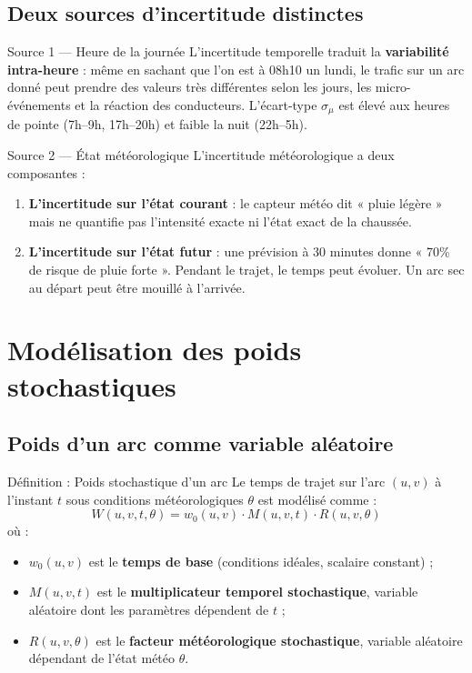 \documentclass[12pt,a4paper]{article}
\theoremstyle{definition}
\theoremstyle{remark}
\begin{document}
\subsection{Deux sources d'incertitude distinctes}

\begin{defbox}{Source 1 — Heure de la journée}
L'incertitude temporelle traduit la \textbf{variabilité intra-heure} :
même en sachant que l'on est à 08h10 un lundi, le trafic sur un arc
donné peut prendre des valeurs très différentes selon les jours,
les micro-événements et la réaction des conducteurs. L'écart-type
$\sigma_\mu$ est élevé aux heures de pointe (7h–9h, 17h–20h) et
faible la nuit (22h–5h).
\end{defbox}

\begin{defbox}{Source 2 — État météorologique}
L'incertitude météorologique a deux composantes :
\begin{enumerate}[leftmargin=1.5em]
  \item \textbf{L'incertitude sur l'état courant} : le capteur météo
    dit « pluie légère » mais ne quantifie pas l'intensité exacte ni
    l'état exact de la chaussée.
  \item \textbf{L'incertitude sur l'état futur} : une prévision à
    30 minutes donne « 70\% de risque de pluie forte ». Pendant le
    trajet, le temps peut évoluer. Un arc sec au départ peut être
    mouillé à l'arrivée.
\end{enumerate}
\end{defbox}

\newpage

\section{Modélisation des poids stochastiques}

\subsection{Poids d'un arc comme variable aléatoire}

\begin{defbox}{Définition : Poids stochastique d'un arc}
Le temps de trajet sur l'arc $(u,v)$ à l'instant $t$ sous conditions
météorologiques $\theta$ est modélisé comme :
\[
  W(u,v,t,\theta) = w_0(u,v) \cdot M(u,v,t) \cdot R(u,v,\theta)
\]
où :
\begin{itemize}[leftmargin=1.5em]
  \item $w_0(u,v)$ est le \textbf{temps de base} (conditions idéales,
    scalaire constant) ;
  \item $M(u,v,t)$ est le \textbf{multiplicateur temporel stochastique},
    variable aléatoire dont les paramètres dépendent de $t$ ;
  \item $R(u,v,\theta)$ est le \textbf{facteur météorologique stochastique},
    variable aléatoire dépendant de l'état météo $\theta$.
\end{itemize}
\end{defbox}
\end{document}
